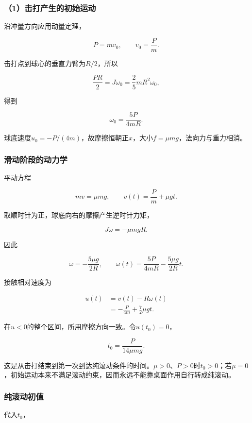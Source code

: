 \documentclass[12pt,a4paper,fontset=fandol]{ctexart}
\begin{document}
\subsubsection{（1）击打产生的初始运动}\label{ux51fbux6253ux4ea7ux751fux7684ux521dux59cbux8fd0ux52a8}

沿冲量方向应用动量定理，

\[
P=mv_0,\qquad \boxed{v_0=\frac Pm}.
\]

击打点到球心的垂直力臂为\(R/2\)，所以

\[
\frac{PR}{2}=J\omega_0
=\frac25mR^2\omega_0,
\]

得到

\[
\boxed{\omega_0=\frac{5P}{4mR}}.
\]

球底速度\(u_0=-P/(4m)\)，故摩擦恒朝正\(x\)，大小\(f=\mu mg\)，法向力与重力相消。

\subsubsection{滑动阶段的动力学}\label{ux6ed1ux52a8ux9636ux6bb5ux7684ux52a8ux529bux5b66}

平动方程

\[
m\dot v=\mu mg,
\qquad
v(t)=\frac Pm+\mu gt.
\]

取顺时针为正，球底向右的摩擦产生逆时针力矩，

\[
J\dot\omega=-\mu mgR.
\]

因此

\[
\dot\omega=-\frac{5\mu g}{2R},
\qquad
\omega(t)=\frac{5P}{4mR}-\frac{5\mu g}{2R}t.
\]

接触相对速度为

\[
\begin{aligned}
u(t)&=v(t)-R\omega(t)\\
&=-\frac P{4m}+\frac72\mu gt.
\end{aligned}
\]

在\(u<0\)的整个区间，所用摩擦方向一致。令\(u(t_0)=0\)，

\[
\boxed{t_0=\frac{P}{14\mu mg}}.
\]

这是从击打结束到第一次到达纯滚动条件的时间。\(\mu>0\)、\(P>0\)时\(t_0>0\)；若\(\mu=0\)，初始运动本来不满足滚动约束，因而永远不能靠桌面作用自行转成纯滚动。

\subsubsection{纯滚动初值}\label{ux7eafux6edaux52a8ux521dux503c}

代入\(t_0\)，
\end{document}
